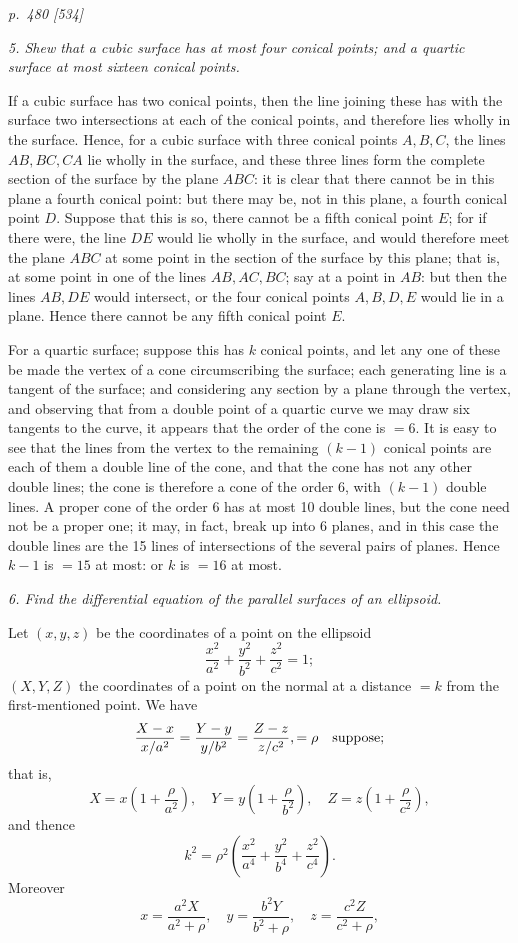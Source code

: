 \documentclass[11pt,a4paper]{article}
\theoremstyle{plain}
\theoremstyle{definition}
\newcommand{\sect}[1]{\medskip\noindent\textit{#1}}
\begin{document}
\clearpage

\bigskip
\textit{p.~480 [534]}
\smallskip

\noindent
\sect{5. Shew that a cubic surface has at most four conical points; and a quartic
surface at most sixteen conical points.}

If a cubic surface has two conical points, then the line joining these has with the
surface two intersections at each of the conical points, and therefore lies wholly in
the surface. Hence, for a cubic surface with three conical points $A,B,C$, the
lines $AB,BC,CA$ lie wholly in the surface, and these three lines form the complete
section of the surface by the plane $ABC$: it is clear that there cannot be in this
plane a fourth conical point: but there may be, not in this plane, a fourth conical
point $D$. Suppose that this is so, there cannot be a fifth conical point $E$; for
if there were, the line $DE$ would lie wholly in the surface, and would therefore
meet the plane $ABC$ at some point in the section of the surface by this plane;
that is, at some point in one of the lines $AB,AC,BC$; say at a point in $AB$:
but then the lines $AB,DE$ would intersect, or the four conical points $A,B,D,E$
would lie in a plane. Hence there cannot be any fifth conical point $E$.

For a quartic surface; suppose this has $k$ conical points, and let any one of these
be made the vertex of a cone circumscribing the surface; each generating line is a
tangent of the surface; and considering any section by a plane through the vertex,
and observing that from a double point of a quartic curve we may draw six tangents
to the curve, it appears that the order of the cone is $=6$. It is easy to see that
the lines from the vertex to the remaining $(k-1)$ conical points are each of them
a double line of the cone, and that the cone has not any other double lines; the
cone is therefore a cone of the order 6, with $(k-1)$ double lines. A proper cone
of the order 6 has at most 10 double lines, but the cone need not be a proper one;
it may, in fact, break up into 6 planes, and in this case the double lines are the
15 lines of intersections of the several pairs of planes. Hence $k-1$ is $=15$ at
most: or $k$ is $=16$ at most.

\sect{6. Find the differential equation of the parallel surfaces of an ellipsoid.}

Let $(x,y,z)$ be the coordinates of a point on the ellipsoid
\[
        \frac{x^2}{a^2}+\frac{y^2}{b^2}+\frac{z^2}{c^2}=1;
\]
$(X,Y,Z)$ the coordinates of a point on the normal at a distance $=k$ from the
first-mentioned point. We have
\[
\frac{X-x}{x/a^2}=\frac{Y-y}{y/b^2}=\frac{Z-z}{z/c^2},=\rho\quad\hbox{suppose;}
\]
that is,
\[
X=x\left(1+\frac{\rho}{a^2}\right),\quad
Y=y\left(1+\frac{\rho}{b^2}\right),\quad
Z=z\left(1+\frac{\rho}{c^2}\right),
\]
and thence
\[
        k^2=\rho^2\left(\frac{x^2}{a^4}+\frac{y^2}{b^4}+\frac{z^2}{c^4}\right).
\]
Moreover
\[
        x=\frac{a^2X}{a^2+\rho},\quad
        y=\frac{b^2Y}{b^2+\rho},\quad
        z=\frac{c^2Z}{c^2+\rho},
\]
\clearpage
\end{document}
